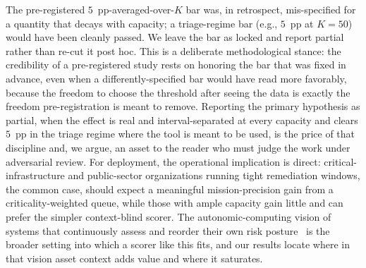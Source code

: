The pre-registered $5$~pp-averaged-over-$K$ bar was, in retrospect, mis-specified for a
quantity that decays with capacity; a triage-regime bar
(e.g., $5$~pp at $K{=}50$) would have been cleanly passed. We leave the bar as locked and
report partial rather than re-cut it post hoc. This is a deliberate methodological stance:
the credibility of a pre-registered study rests on honoring the bar that was fixed in advance,
even when a differently-specified bar would have read more favorably, because the freedom to
choose the threshold after seeing the data is exactly the freedom pre-registration is meant to
remove. Reporting the primary hypothesis as partial, when the effect is real and
interval-separated at every capacity and clears $5$~pp in the triage regime where the tool is
meant to be used, is the price of that discipline and, we argue, an asset to the reader who must
judge the work under adversarial review. For deployment, the operational implication is direct:
critical-infrastructure and public-sector organizations running tight remediation windows, the
common case, should expect a meaningful mission-precision gain from a criticality-weighted
queue, while those with ample capacity gain little and can prefer the simpler context-blind
scorer. The autonomic-computing vision of
systems that continuously assess and reorder their own risk posture~\cite{kephart2003vision}
is the broader setting into which a scorer like this fits, and our results locate where in that
vision asset context adds value and where it saturates.

